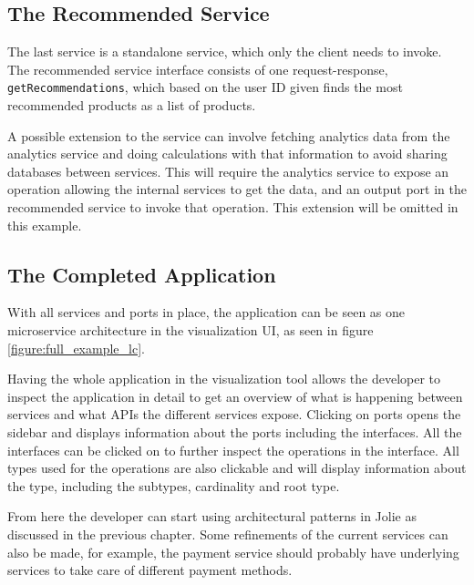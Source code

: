 \subsection{The Recommended Service}
The last service is a standalone service, which only the client needs to invoke.
The recommended service interface consists of one request-response, \texttt{getRecommendations},
which based on the user ID given finds the most recommended products as a list of products.

A possible extension to the service can involve fetching analytics data from the analytics service and doing calculations with that information to avoid sharing databases between services. This will require the analytics service to expose an operation allowing the internal services to get the data, and an output port in the recommended service to invoke that operation.
This extension will be omitted in this example.

\subsection{The Completed Application}
With all services and ports in place, the application can be seen as one microservice architecture in the visualization UI, as seen in figure \ref*{figure:full_example_lc}.

Having the whole application in the visualization tool allows the developer to inspect the application in detail to get an overview of what is happening between services and what APIs the different services expose.
Clicking on ports opens the sidebar and displays information about the ports including the interfaces. All the interfaces can be clicked on to further inspect the operations in the interface. All types used for the operations are also clickable and will display information about the type,
including the subtypes, cardinality and root type.

From here the developer can start using architectural patterns in Jolie as discussed in the previous chapter. Some refinements of the current services can also be made, for example, the payment service should probably have underlying services to take care of different payment methods.

